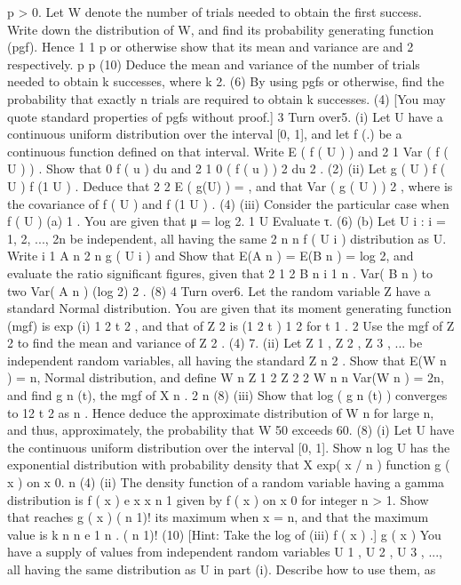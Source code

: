 p > 0. Let W denote the number of trials needed to obtain the first success. Write
down the distribution of W, and find its probability generating function (pgf). Hence
1
1 p
or otherwise show that its mean and variance are
and 2 respectively.
p
p
(10)
Deduce the mean and variance of the number of trials needed to obtain k successes,
where k 2.
(6)
By using pgfs or otherwise, find the probability that exactly n trials are required to
obtain k successes.
(4)
[You may quote standard properties of pgfs without proof.]
3
Turn over5.
(i)
Let U have a continuous uniform distribution over the interval [0, 1], and let
f (.) be a continuous function defined on that interval. Write
E ( f ( U ) ) and
2
1
Var ( f ( U ) ) . Show that
0
f ( u ) du and
2
1
0
( f ( u ) ) 2 du
2
.
(2)
(ii)
Let g ( U )
f ( U )
f (1 U )
. Deduce that
2
2
E ( g(U) ) = , and that Var ( g ( U ) )
2
,
where is the covariance of f ( U ) and f (1 U ) .
(4)
(iii)
Consider the particular case when f ( U )
(a)
1
. You are given that μ = log 2.
1 U
Evaluate τ.
(6)
(b)
Let {U i : i = 1, 2, ..., 2n} be independent, all having the same
2 n
n
f ( U i )
distribution as U.
Write
i 1
A n
2 n
g ( U i )
and
Show that E(A n ) = E(B n ) = log 2, and evaluate the ratio
significant figures, given that
2
1
2
B n
i 1
n
.
Var( B n )
to two
Var( A n )
(log 2) 2 .
(8)
4
Turn over6.
Let the random variable Z have a standard Normal distribution. You are given that its
moment generating function (mgf) is exp
(i)
1 2
t
2
, and that of Z 2 is (1 2 t )
1
2
for t
1
.
2
Use the mgf of Z 2 to find the mean and variance of Z 2 .
(4)
7.
(ii) Let Z 1 , Z 2 , Z 3 , ... be independent random variables, all having the standard
Z n 2 . Show that E(W n ) = n,
Normal distribution, and define W n Z 1 2 Z 2 2
W n n
Var(W n ) = 2n, and find g n (t), the mgf of X n
.
2 n
(8)
(iii) Show that log ( g n (t) ) converges to 12 t 2 as n
. Hence deduce the
approximate distribution of W n for large n, and thus, approximately, the
probability that W 50 exceeds 60.
(8)
(i) Let U have the continuous uniform distribution over the interval [0, 1]. Show
n log U has the exponential distribution with probability density
that X
exp( x / n )
function g ( x )
on x 0.
n
(4)
(ii) The density function of a random variable having a gamma distribution is
f ( x )
e x x n 1
given by f ( x )
on x 0 for integer n > 1. Show that
reaches
g ( x )
( n 1)!
its maximum when x = n, and that the maximum value is k
n n e 1 n
.
( n 1)!
(10)
[Hint: Take the log of
(iii)
f ( x )
.]
g ( x )
You have a supply of values from independent random variables U 1 , U 2 , U 3 , ...,
all having the same distribution as U in part (i). Describe how to use them, as
